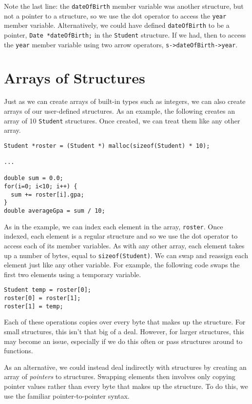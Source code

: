 Note the last line: the \texttt{dateOfBirth} member variable
was another structure, but not a pointer to a structure, so we
use the dot operator to access the \texttt{year} member
variable.  Alternatively, we could have defined \texttt{dateOfBirth}
to be a pointer, \texttt{Date *dateOfBirth;} in the 
\texttt{Student} structure.  If we had, then to access the 
\texttt{year} member variable using two arrow operators, 
\texttt{s->dateOfBirth->year}.

\section{Arrays of Structures}

Just as we can create arrays of built-in types such as integers, 
we can also create arrays of our user-defined structures.  As
an example, the following creates an array of 10 \texttt{Student}
structures.  Once created, we can treat them like any other
array.  

\begin{verbatim}
Student *roster = (Student *) malloc(sizeof(Student) * 10);

...

double sum = 0.0;
for(i=0; i<10; i++) {
  sum += roster[i].gpa;
}
double averageGpa = sum / 10;
\end{verbatim}

As in the example, we can index each element in the array, 
\texttt{roster}.  Once indexed, each element is a 
regular structure and so we use the dot operator to access
each of its member variables.  As with any other array, 
each element takes up a number of bytes, equal to 
\texttt{sizeof(Student)}.  We can swap and reassign
each element just like any other variable.  For example, 
the following code swaps the first two elements using
a temporary variable.

\begin{verbatim}
Student temp = roster[0];
roster[0] = roster[1];
roster[1] = temp;
\end{verbatim}

Each of these operations copies over every byte that makes up
the structure.  For small structures, this isn't that big of
a deal.  However, for larger structures, this may become an
issue, especially if we do this often or pass structures around
to functions.

As an alternative, we could instead deal indirectly with structures
by creating an array of \emph{pointers} to structures.  Swapping
elements then involves only copying pointer values rather than
every byte that makes up the structure.  To do this, we use
the familiar pointer-to-pointer syntax.

